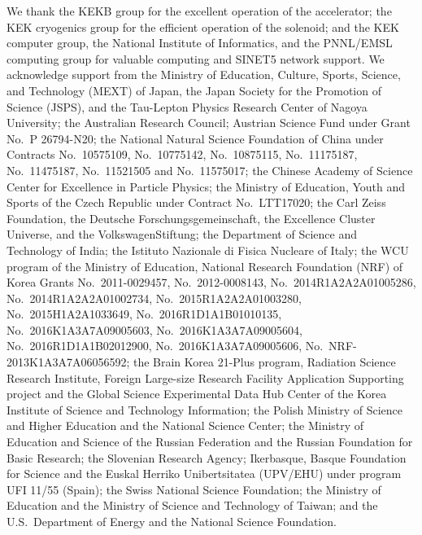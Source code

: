 \documentclass[aps,prl,twocolumn,superscriptaddress,showpacs,preprintnumbers,amsmath,amssymb]{revtex4}
\begin{document}

We thank the KEKB group for the excellent operation of the
accelerator; the KEK cryogenics group for the efficient
operation of the solenoid; and the KEK computer group,
the National Institute of Informatics, and the 
PNNL/EMSL computing group for valuable computing
and SINET5 network support.  We acknowledge support from
the Ministry of Education, Culture, Sports, Science, and
Technology (MEXT) of Japan, the Japan Society for the 
Promotion of Science (JSPS), and the Tau-Lepton Physics 
Research Center of Nagoya University; 
the Australian Research Council;
Austrian Science Fund under Grant No.~P 26794-N20;
the National Natural Science Foundation of China under Contracts 
No.~10575109, No.~10775142, No.~10875115, No.~11175187, No.~11475187, 
No.~11521505 and No.~11575017;
the Chinese Academy of Science Center for Excellence in Particle Physics; 
the Ministry of Education, Youth and Sports of the Czech
Republic under Contract No.~LTT17020;
the Carl Zeiss Foundation, the Deutsche Forschungsgemeinschaft, the
Excellence Cluster Universe, and the VolkswagenStiftung;
the Department of Science and Technology of India; 
the Istituto Nazionale di Fisica Nucleare of Italy; 
the WCU program of the Ministry of Education, National Research Foundation (NRF)
of Korea Grants No.~2011-0029457, No.~2012-0008143,
No.~2014R1A2A2A01005286,
No.~2014R1A2A2A01002734, No.~2015R1A2A2A01003280,
No.~2015H1A2A1033649, No.~2016R1D1A1B01010135, No.~2016K1A3A7A09005603, No.~2016K1A3A7A09005604, No.~2016R1D1A1B02012900,
No.~2016K1A3A7A09005606, No.~NRF-2013K1A3A7A06056592;
the Brain Korea 21-Plus program, Radiation Science Research Institute, Foreign Large-size Research Facility Application Supporting project and the Global Science Experimental Data Hub Center of the Korea Institute of Science and Technology Information;
the Polish Ministry of Science and Higher Education and 
the National Science Center;
the Ministry of Education and Science of the Russian Federation and
the Russian Foundation for Basic Research;
the Slovenian Research Agency;
Ikerbasque, Basque Foundation for Science and
the Euskal Herriko Unibertsitatea (UPV/EHU) under program UFI 11/55 (Spain);
the Swiss National Science Foundation; 
the Ministry of Education and the Ministry of Science and Technology of Taiwan;
and the U.S.\ Department of Energy and the National Science Foundation.
\end{document}
